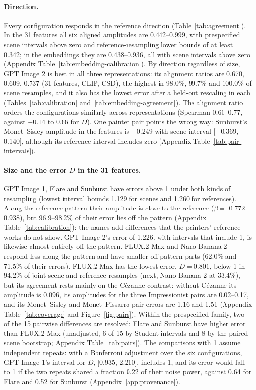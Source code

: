 \documentclass[10pt]{article}
\begin{document}


\paragraph{Direction.} Every configuration responds in the reference direction
(Table~\ref{tab:agreement}). In the 31 features all six aligned amplitudes are 0.442--0.999, with
prespecified scene intervals above zero and reference-resampling lower bounds of at least 0.342; in
the embeddings they are 0.438--0.936, all with scene intervals above zero (Appendix
Table~\ref{tab:embedding-calibration}). By direction regardless of size, GPT Image 2 is best in all
three representations: its alignment ratios are 0.670, 0.609, 0.737 (31 features, CLIP, CSD), the
highest in 98.0\%, 99.7\% and 100.0\% of scene resamples, and it also has the lowest error after a
held-out rescaling in each (Tables~\ref{tab:calibration} and~\ref{tab:embedding-agreement}). The
alignment ratio orders the configurations similarly across representations (Spearman
0.60--0.77, against $-$0.14 to 0.66 for $D$). One painter pair points the wrong way: Sunburst's
Monet--Sisley amplitude in the features is $-$0.249 with scene interval [$-$0.369, $-$0.140], although
its reference interval includes zero (Appendix Table~\ref{tab:pair-intervals}).

\paragraph{Size and the error $D$ in the 31 features.} GPT Image 1, Flare and Sunburst have errors
above 1 under both kinds of resampling (lowest interval bounds 1.129 for scenes and 1.260 for
references). Along the reference pattern their amplitude is close to the reference ($\beta=$
0.772--0.938), but 96.9--98.2\% of their error lies off the pattern (Appendix
Table~\ref{tab:calibration}): the names add differences that the painters' reference works do not
show. GPT Image 2's error of 1.226, with intervals that include 1, is likewise almost entirely off
the pattern. FLUX.2 Max and Nano Banana 2 respond less along the pattern and have smaller
off-pattern parts (62.0\% and 71.5\% of their errors). FLUX.2 Max has the lowest error, $D=0.801$,
below 1 in 94.2\% of joint scene and reference resamples (next, Nano Banana 2 at 33.4\%), but its
agreement rests mainly on the C\'ezanne contrast: without C\'ezanne its amplitude is 0.096, its
amplitudes for the three Impressionist pairs are 0.02--0.17, and its Monet--Sisley and
Monet--Pissarro pair errors are 1.16 and 1.51 (Appendix Table~\ref{tab:coverage} and
Figure~\ref{fig:pairs}). Within the prespecified family, two of the 15 pairwise differences are
resolved: Flare and Sunburst have higher error than FLUX.2 Max (unadjusted, 6 of 15 by Student
intervals and 8 by the paired-scene bootstrap; Appendix Table~\ref{tab:pairs}). The comparisons with
1 assume independent repeats: with a Bonferroni adjustment over the six configurations, GPT Image
1's interval for $D$, [0.935, 2.210], includes 1, and its error would fall to 1 if the two repeats
shared a fraction 0.22 of their noise power, against 0.64 for Flare and 0.52 for Sunburst
(Appendix~\ref{app:provenance}).
\end{document}
